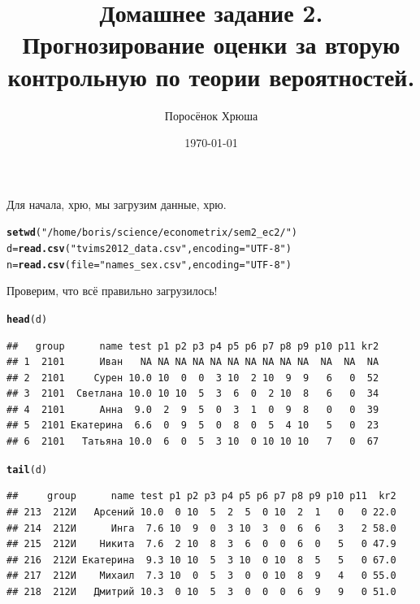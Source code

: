 \documentclass[pdftex,12pt,a4paper]{article}\usepackage{graphicx, color}
\title{Домашнее задание 2. \\ 
{\small Прогнозирование оценки за вторую контрольную по теории вероятностей.}}
\author{Поросёнок Хрюша}
\date{\today}
\makeatletter
\newcommand{\hlfunctioncall}[1]{\textcolor[rgb]{0.501960784313725,0,0.329411764705882}{\textbf{#1}}}%
\newcommand{\hlstring}[1]{\textcolor[rgb]{0.6,0.6,1}{#1}}%
\newenvironment{kframe}{%
 \def\at@end@of@kframe{}%
 \ifinner\ifhmode%
  \def\at@end@of@kframe{\end{minipage}}%
  \begin{minipage}{\columnwidth}%
 \fi\fi%
 \def\FrameCommand##1{\hskip\@totalleftmargin \hskip-\fboxsep
 \colorbox{shadecolor}{##1}\hskip-\fboxsep
     \hskip-\linewidth \hskip-\@totalleftmargin \hskip\columnwidth}%
 \MakeFramed {\advance\hsize-\width
   \@totalleftmargin\z@ \linewidth\hsize
   \@setminipage}}%
 {\par\unskip\endMakeFramed%
 \at@end@of@kframe}
\newenvironment{knitrout}{}{} %
\makeatother
\begin{document}
\maketitle %


Для начала, хрю, мы загрузим данные, хрю.

\begin{knitrout}
\color{fgcolor}\begin{kframe}
\begin{alltt}
\hlfunctioncall{setwd}(\hlstring{"/home/boris/science/econometrix/sem2_ec2/"})
d = \hlfunctioncall{read.csv}(\hlstring{"tvims2012_data.csv"}, encoding = \hlstring{"UTF-8"})
n = \hlfunctioncall{read.csv}(file = \hlstring{"names_sex.csv"}, encoding = \hlstring{"UTF-8"})
\end{alltt}
\end{kframe}
\end{knitrout}




Проверим, что всё правильно загрузилось!
\begin{knitrout}
\color{fgcolor}\begin{kframe}
\begin{alltt}
\hlfunctioncall{head}(d)
\end{alltt}
\begin{verbatim}
##   group      name test p1 p2 p3 p4 p5 p6 p7 p8 p9 p10 p11 kr2
## 1  2101      Иван   NA NA NA NA NA NA NA NA NA NA  NA  NA  NA
## 2  2101     Сурен 10.0 10  0  0  3 10  2 10  9  9   6   0  52
## 3  2101  Светлана 10.0 10 10  5  3  6  0  2 10  8   6   0  34
## 4  2101      Анна  9.0  2  9  5  0  3  1  0  9  8   0   0  39
## 5  2101 Екатерина  6.6  0  9  5  0  8  0  5  4 10   5   0  23
## 6  2101   Татьяна 10.0  6  0  5  3 10  0 10 10 10   7   0  67
\end{verbatim}
\begin{alltt}
\hlfunctioncall{tail}(d)
\end{alltt}
\begin{verbatim}
##     group      name test p1 p2 p3 p4 p5 p6 p7 p8 p9 p10 p11  kr2
## 213  212И   Арсений 10.0  0 10  5  2  5  0 10  2  1   0   0 22.0
## 214  212И      Инга  7.6 10  9  0  3 10  3  0  6  6   3   2 58.0
## 215  212И    Никита  7.6  2 10  8  3  6  0  0  6  0   5   0 47.9
## 216  212И Екатерина  9.3 10 10  5  3 10  0 10  8  5   5   0 67.0
## 217  212И    Михаил  7.3 10  0  5  3  0  0 10  8  9   4   0 55.0
## 218  212И   Дмитрий 10.3  0 10  5  3  0  0  0  6  9   9   0 51.0
\end{verbatim}
\end{kframe}
\end{knitrout}
\end{document}
